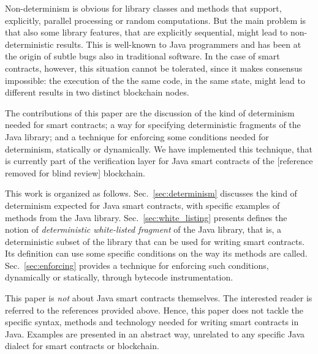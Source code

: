 Non-determinism is obvious for library classes and methods that support, explicitly,
parallel processing or random computations. But the main problem is that
also some library features, that are explicitly sequential, might lead to
non-deterministic results.
This is well-known to Java programmers and has been at the origin of subtle
bugs also in traditional software. In the case of smart contracts, however,
this situation cannot be tolerated, since it makes consensus impossible:
the execution of the the same code, in the same state,
might lead to different results in two distinct blockchain nodes.

The contributions of this paper are the discussion of the kind of determinism
needed for smart contracts; a way for specifying deterministic fragments
of the Java library; and a technique for
enforcing some conditions needed for determinism, statically or dynamically.
We have implemented this technique, that is currently part of the verification
layer for Java smart contracts of the [reference removed for blind review] blockchain.

This work is organized as follows.
Sec.~\ref{sec:determinism} discusses the kind of determinism expected for Java smart contracts,
with specific examples of methods from the Java library.
Sec.~\ref{sec:white_listing} presents defines the notion of \emph{deterministic white-listed fragment} of the Java library,
that is, a deterministic subset of the library that can be used for writing smart contracts. Its definition can use some
specific conditions on the way its methods are called.
Sec.~\ref{sec:enforcing} provides a technique for enforcing such conditions, dynamically
or statically, through bytecode instrumentation.

This paper is \emph{not} about Java smart contracts themselves. The interested reader
is referred to the references provided above. Hence, this paper does not tackle
the specific syntax, methods and technology needed for writing smart contracts in Java.
Examples are presented in an abstract way, unrelated to any specific
Java dialect for smart contracts or blockchain.
